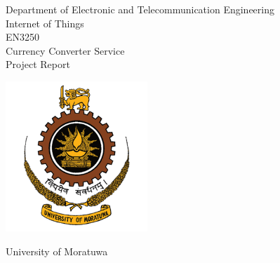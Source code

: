 \begin{titlepage}

    \begin{center}
    
        {\fontsize{22}{27}\selectfont Department of Electronic and Telecommunication Engineering} 
	\vspace{\baselineskip}
	\vspace{\baselineskip}
        {\fontsize{20}{24}\selectfont \\Internet of Things}  
        {\fontsize{16}{19}\selectfont \\EN3250} 
    \vspace{\baselineskip}
	\vspace{\baselineskip}
        {\fontsize{20}{24}\selectfont \\Currency Converter Service}  
	   {\fontsize{18}{21}\selectfont \\Project Report\\} 
		\vspace{\baselineskip}
    \end{center}

   \begin{center}
        \includegraphics[width=0.4\textwidth]{images/uom.png}
    \end{center}
   \begin{center}   
      {\fontsize{16}{19}\selectfont University of Moratuwa\\}   
      \vspace{\baselineskip}
    \end{center}

\begin{flushleft}

{\fontsize{16}{19}\selectfont
{}

}
\end{flushleft}
\end{titlepage}
